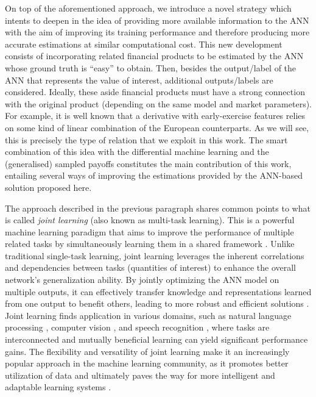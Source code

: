     On top of the aforementioned approach, we introduce a novel strategy which intents to deepen in the idea of providing more available information to the ANN with the aim of improving its training performance and therefore producing more accurate estimations at similar computational cost. This new development consists of incorporating related financial products to be estimated by the ANN whose ground truth is ``easy'' to obtain. Then, besides the output/label of the ANN that represents the value of interest, additional outputs/labels are considered. Ideally, these aside financial products must have a strong connection with the original product (depending on the same model and market parameters). For example, it is well known that a derivative with early-exercise features relies on some kind of linear combination of the European counterparts. As we will see, this is precisely the type of relation that we exploit in this work. The smart combination of this idea with the differential machine learning and the (generalised) sampled payoffs constitutes the main contribution of this work, entailing several ways of improving the estimations provided by the ANN-based solution proposed here.

    The approach described in the previous paragraph shares common points to what is called \emph{joint learning} (also known as multi-task learning). This is a powerful machine learning paradigm that aims to improve the performance of multiple related tasks by simultaneously learning them in a shared framework \cite{crawshaw2020}. Unlike traditional single-task learning, joint learning leverages the inherent correlations and dependencies between tasks (quantities of interest) to enhance the overall network's generalization ability. By jointly optimizing the ANN model on multiple outputs, it can effectively transfer knowledge and representations learned from one output to benefit others, leading to more robust and efficient solutions \cite{crawshaw2020}. Joint learning finds application in various domains, such as natural language processing \cite{zhang2022}, computer vision \cite{muller2022}, and speech recognition \cite{li2021}, where tasks are interconnected and mutually beneficial learning can yield significant performance gains. The flexibility and versatility of joint learning make it an increasingly popular approach in the machine learning community, as it promotes better utilization of data and ultimately paves the way for more intelligent and adaptable learning systems \cite{ruder2017}.

